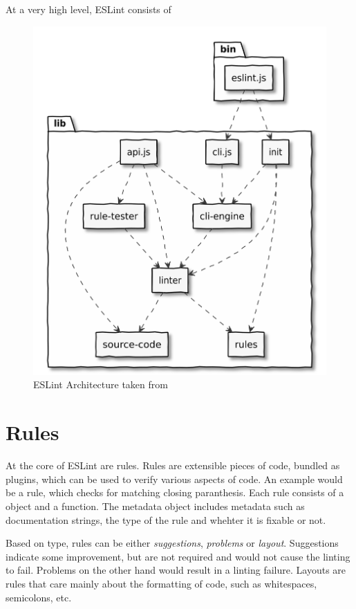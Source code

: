 At a very high level, ESLint consists of 
\begin{figure}[H]
    \includegraphics[width=\textwidth]{images/eslint_architecture.png}
     \caption{ESLint Architecture taken from \cite{eslintArchitecture}}
     \label{fig:eslintArchitecture}
   \end{figure}


\section{Rules}
At the core of ESLint are rules. Rules are extensible pieces of code, bundled as plugins, which can be used to verify various aspects of code. An example would be a rule, which checks for matching closing paranthesis. 
Each rule consists of a  object
and a  function. The metadata object includes metadata such as documentation strings, the type of the rule and whehter it is fixable or not.

Based on type, rules can be either \textit{suggestions}, \textit{problems} or \textit{layout}. Suggestions indicate some improvement, but are not required and would not cause the linting to fail. Problems on the other hand would result in a linting failure. Layouts are rules that care mainly about the formatting of code, such as whitespaces, semicolons, etc. 

